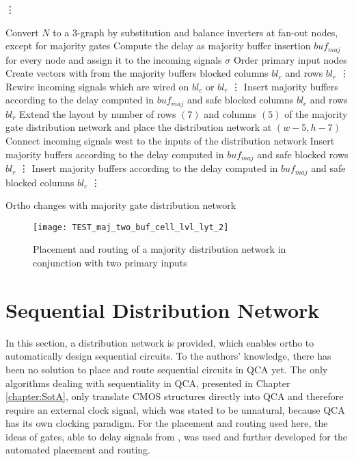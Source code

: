 \begin{algorithm}[H]
	\vdots
	
	\begin{algorithmic}
		\State Convert $N$ to a 3-graph by substitution and balance inverters at fan-out nodes, except for majority gates
		\State Compute the delay as majority buffer insertion $buf_{maj}$ for every node and assign it to the incoming signals $\sigma$
		\State Order primary input nodes
		\State Create vectors with from the majority buffers blocked columns $bl_c$ and rows $bl_r$
		\State \vdots
		\State Rewire incoming signals which are wired on $bl_c$ or $bl_r$
		\State \vdots
		\EndIf
		\State Insert majority buffers according to the delay computed in $buf_{maj}$ and safe blocked columns $bl_c$ and rows $bl_r$
		\State Extend the layout by number of rows $(7)$ and columns $(5)$ of the majority gate distribution network and place the distribution network at $(w-5, h-7)$
		\State Connect incoming signals west to the inputs of the distribution network
		\State Insert majority buffers according to the delay computed in $buf_{maj}$ and safe blocked rows $bl_r$
		\State \vdots
		\State Insert majority buffers according to the delay computed in $buf_{maj}$ and safe blocked columns $bl_c$
		\State \vdots
		\EndIf
		
		\EndFor
	\end{algorithmic}
	\caption{Ortho changes with majority gate distribution network}\label{alg:majority_network}
\end{algorithm}

\begin{sidewaysfigure}
	\centering
	\texttt{[image: TEST\_maj\_two\_buf\_cell\_lvl\_lyt\_2]}
	\caption{Placement and routing of a majority distribution network in conjunction with two primary inputs}\label{fig:majority_with_buf}
\end{sidewaysfigure}


\section{Sequential Distribution Network}
In this section, a distribution network is provided, which enables ortho to automatically design sequential circuits. To the authors' knowledge, there has been no solution to place and route sequential circuits in QCA yet. The only algorithms dealing with sequentiality in QCA, presented in Chapter \ref{chapter:SotA}, only translate CMOS structures directly into QCA and therefore require an external clock signal, which was stated to be unnatural, because QCA has its own clocking paradigm. For the placement and routing used here, the ideas of gates, able to delay signals from \cite{Walter}, was used and further developed for the automated placement and routing.


